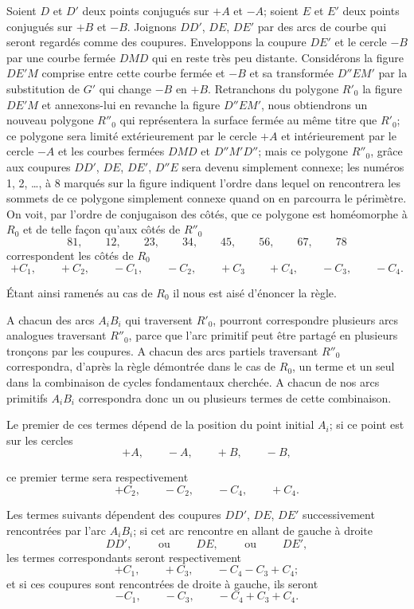 \documentclass{article}
\begin{document}
Soient $D$ et $D'$ deux points conjugués sur $+A$ et $-A$; soient $E$ et $E'$ deux points conjugués sur $+B$ et $-B$. Joignons $DD'$, $DE$, $DE'$ par des arcs de courbe qui seront regardés comme des coupures. Enveloppons la coupure $DE'$ et le cercle $-B$ par une courbe fermée $DMD$ qui en reste très peu distante. Considérons la figure $DE'M$ comprise entre cette courbe fermée et $-B$ et sa transformée $D''EM'$ par la substitution de $G'$ qui change $-B$ en $+B$. Retranchons du polygone $R'_{0}$ la figure $DE'M$ et annexons-lui en revanche la figure $D''EM'$, nous obtiendrons un nouveau polygone $R''_{0}$ qui représentera la surface fermée au même titre que $R'_{0}$; ce polygone sera limité extérieurement par le cercle $+A$ et intérieurement par le cercle $-A$ et les courbes fermées $DMD$ et $D''M'D''$; mais ce polygone $R''_{0}$, grâce aux coupures $DD'$, $DE$, $DE'$, $D''E$ sera devenu simplement connexe; les numéros 1, 2, \ldots, à 8 marqués sur la figure indiquent l'ordre dans lequel on rencontrera les sommets de ce polygone simplement connexe quand on en parcourra le périmètre. On voit, par l'ordre de conjugaison des côtés, que ce polygone est homéomorphe à $R_{0}$ et de telle façon qu'aux côtés de $R''_{0}$
\[ 81, \qquad 12, \qquad 23, \qquad 34, \qquad 45, \qquad 56, \qquad 67, \qquad 78 \]
correspondent les côtés de $R_{0}$
\[ +C_{1}, \qquad +C_{2}, \qquad -C_{1}, \qquad -C_{2}, \qquad +C_{3} \qquad +C_{4}, \qquad -C_{3}, \qquad -C_{4}. \]

Étant ainsi ramenés au cas de $R_{0}$ il nous est aisé d'énoncer la règle.

A chacun des arcs $A_{i}B_{i}$ qui traversent $R'_{0}$, pourront correspondre plusieurs arcs analogues traversant $R''_{0}$, parce que l'arc primitif peut être partagé en plusieurs tronçons par les coupures. A chacun des arcs partiels traversant $R''_{0}$ correspondra, d'après la règle démontrée dans le cas de $R_{0}$, un terme et un seul dans la combinaison de cycles fondamentaux cherchée. A chacun de nos arcs primitifs $A_{i}B_{i}$ correspondra donc un ou plusieurs termes de cette combinaison.

Le premier de ces termes dépend de la position du point initial $A_{i}$; si ce point est sur les cercles
\[ +A, \qquad -A, \qquad +B, \qquad -B, \]

ce premier terme sera respectivement
\[ +C_{2}, \qquad -C_{2}, \qquad -C_{4}, \qquad +C_{4}. \]

Les termes suivants dépendent des coupures $DD'$, $DE$, $DE'$ successivement rencontrées par l'arc $A_{i}B_{i}$; si cet arc rencontre en allant de gauche à droite
\[ DD', \qquad \text{ ou } \qquad DE, \qquad \text{ ou } \qquad DE', \]
les termes correspondants seront respectivement
\[ +C_{1}, \qquad +C_{3}, \qquad -C_{4} - C_{3} + C_{4}; \]
et si ces coupures sont rencontrées de droite à gauche, ils seront
\[ -C_{1}, \qquad -C_{3}, \qquad -C_{4} + C_{3} + C_{4}. \]
\end{document}
